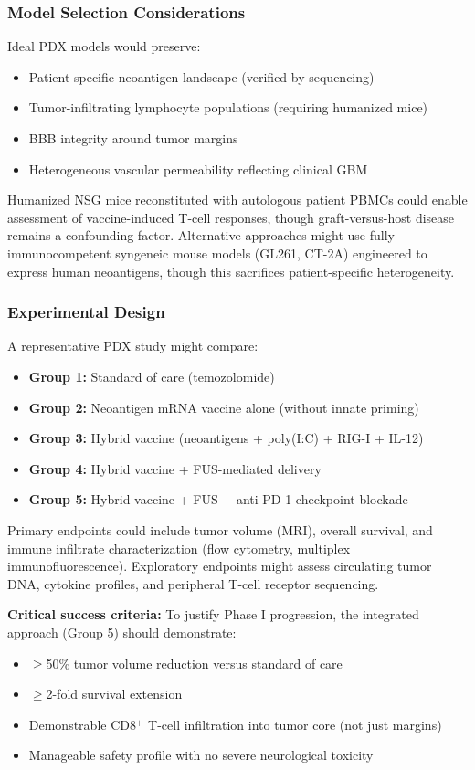 \documentclass[12pt]{article}
\begin{document}
\subsubsection{Model Selection Considerations}
Ideal PDX models would preserve:
\begin{itemize}[leftmargin=*,noitemsep]
\item Patient-specific neoantigen landscape (verified by sequencing)
\item Tumor-infiltrating lymphocyte populations (requiring humanized mice)
\item BBB integrity around tumor margins
\item Heterogeneous vascular permeability reflecting clinical GBM
\end{itemize}

Humanized NSG mice reconstituted with autologous patient PBMCs could enable assessment of vaccine-induced T-cell responses, though graft-versus-host disease remains a confounding factor. Alternative approaches might use fully immunocompetent syngeneic mouse models (GL261, CT-2A) engineered to express human neoantigens, though this sacrifices patient-specific heterogeneity.

\subsubsection{Experimental Design}
A representative PDX study might compare:
\begin{itemize}[leftmargin=*,noitemsep]
\item \textbf{Group 1:} Standard of care (temozolomide)
\item \textbf{Group 2:} Neoantigen mRNA vaccine alone (without innate priming)
\item \textbf{Group 3:} Hybrid vaccine (neoantigens + poly(I:C) + RIG-I + IL-12)
\item \textbf{Group 4:} Hybrid vaccine + FUS-mediated delivery
\item \textbf{Group 5:} Hybrid vaccine + FUS + anti-PD-1 checkpoint blockade
\end{itemize}

Primary endpoints could include tumor volume (MRI), overall survival, and immune infiltrate characterization (flow cytometry, multiplex immunofluorescence). Exploratory endpoints might assess circulating tumor DNA, cytokine profiles, and peripheral T-cell receptor sequencing.

\textbf{Critical success criteria:} To justify Phase I progression, the integrated approach (Group 5) should demonstrate:
\begin{itemize}[leftmargin=*,noitemsep]
\item $\geq$50\% tumor volume reduction versus standard of care
\item $\geq$2-fold survival extension
\item Demonstrable CD8$^+$ T-cell infiltration into tumor core (not just margins)
\item Manageable safety profile with no severe neurological toxicity
\end{itemize}
\end{document}
